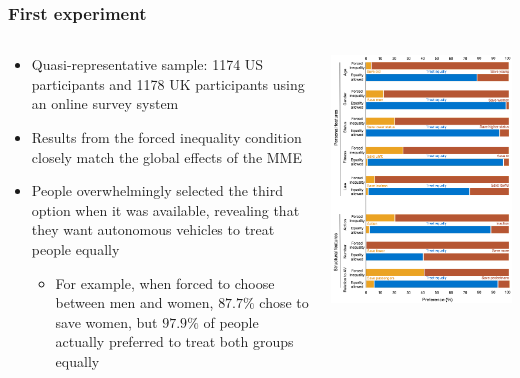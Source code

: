 \documentclass[aspectratio=169]{beamer}
\begin{document}
\begin{frame}
    \frametitle{First experiment}
    \begin{columns}[totalwidth=1.0\textwidth]
        \begin{column}{0.6\linewidth}
            \begin{itemize}
                \item Quasi-representative sample: \num{1174} US participants and \num{1178} UK participants using an online survey system
                \item Results from the forced inequality condition closely match the global effects of the MME
                \item People overwhelmingly selected the third option when it was available, revealing that they want autonomous vehicles to treat people equally
                      \begin{itemize}
                          \item For example, when forced to choose between men and women, $87.7\%$ chose to save women, but $97.9\%$ of people actually preferred to treat both groups equally
                      \end{itemize}
            \end{itemize}
        \end{column}
        \begin{column}{0.35\linewidth}
            \includegraphics[width=1.0\linewidth]{assets/against-mme-first-experiment.png}
        \end{column}
    \end{columns}
\end{frame}
\end{document}
